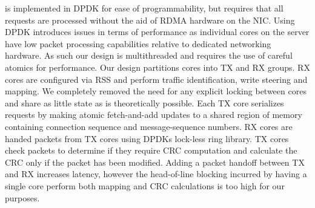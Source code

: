 {\sword} is implemented in DPDK for ease of programmability, but
requires that all requests are processed without the aid of RDMA
hardware on the NIC. Using DPDK introduces issues in terms of
performance as individual cores on the server have low packet
processing capabilities relative to dedicated networking hardware. As
such our design is multithreaded and requires the use of careful
atomics for performance.  Our design partitions cores into TX and RX
groups. RX cores are configured via RSS and perform traffic
identification, write steering and mapping. We completely removed the
need for any explicit locking between cores and share as little state
as is theoretically possible. Each TX core serializes requests by
making atomic fetch-and-add updates to a shared region of memory
containing connection sequence and message-sequence numbers. RX cores
are handed packets from TX cores using DPDKs lock-less ring
library. TX cores check packets to determine if they require CRC
computation and calculate the CRC only if the packet has been
modified. Adding a packet handoff between TX and RX increases latency,
however the head-of-line blocking incurred by having a single core
perform both mapping and CRC calculations is too high for our purposes.
